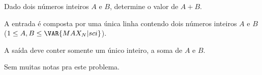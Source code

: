 Dado dois números inteiros $A$ e $B$, determine o valor de $A + B$.

A entrada é composta por uma única linha contendo dois números
inteiros $A$ e $B$ ($1 \leq A, B \leq \VAR{MAX_N | sci}$).

A saída deve conter somente um único inteiro, a soma de $A$ e $B$.

Sem muitas notas pra este problema.
